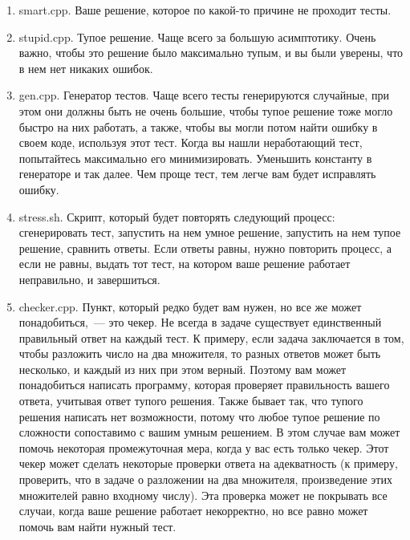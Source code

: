 \begin{enumerate}

    \item smart.cpp. Ваше решение, которое по какой-то причине не проходит тесты.

    \item stupid.cpp. Тупое решение. Чаще всего за большую асимптотику. Очень важно, чтобы это решение было максимально тупым, и вы были уверены, что в нем нет никаких ошибок.

    \item gen.cpp. Генератор тестов. Чаще всего тесты генерируются случайные, при этом они должны быть не очень большие, чтобы тупое решение тоже могло быстро на них работать, а также, чтобы вы могли потом найти ошибку в своем коде, используя этот тест. Когда вы нашли неработающий тест, попытайтесь максимально его минимизировать. Уменьшить константу в генераторе и так далее. Чем проще тест, тем легче вам будет исправлять ошибку.

    \item stress.sh. Скрипт, который будет повторять следующий процесс: сгенерировать тест, запустить на нем умное решение, запустить на нем тупое решение, сравнить ответы. Если ответы равны, нужно повторить процесс, а если не равны, выдать тот тест, на котором ваше решение работает неправильно, и завершиться.

        \item checker.cpp. Пункт, который редко будет вам нужен, но все же может понадобиться,~--- это чекер. Не всегда в задаче существует единственный правильный ответ на каждый тест. К примеру, если задача заключается в том, чтобы разложить число на два множителя, то разных ответов может быть несколько, и каждый из них при этом верный. Поэтому вам может понадобиться написать программу, которая проверяет правильность вашего ответа, учитывая ответ тупого решения. Также бывает так, что тупого решения написать нет возможности, потому что любое тупое решение по сложности сопоставимо с вашим умным решением. В этом случае вам может помочь некоторая промежуточная мера, когда у вас есть только чекер. Этот чекер может сделать некоторые проверки ответа на адекватность (к примеру, проверить, что в задаче о разложении на два множителя, произведение этих множителей равно входному числу). Эта проверка может не покрывать все случаи, когда ваше решение работает некорректно, но все равно может помочь вам найти нужный тест.

\end{enumerate}

